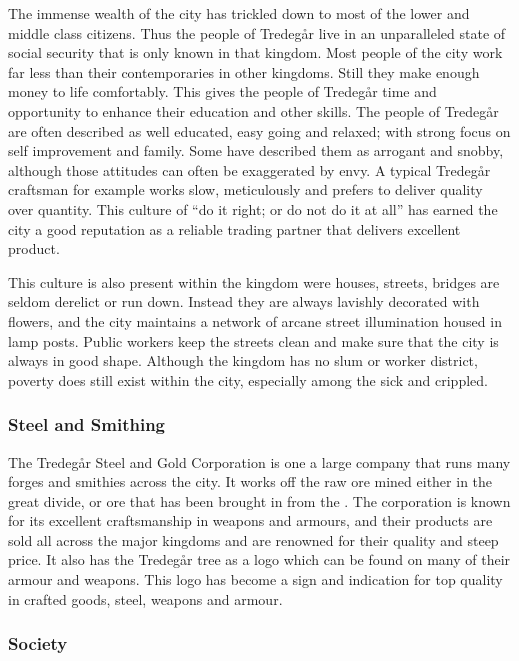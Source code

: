 The immense wealth of the city has trickled down to most of the lower and middle
class citizens. Thus the people of Tredegår live in an unparalleled state of
social security that is only known in that kingdom. Most people of the city
work far less than their contemporaries in other kingdoms. Still they make
enough money to life comfortably. This gives the people of Tredegår time and
opportunity to enhance their education and other skills. The people of Tredegår
are often described as well educated, easy going and relaxed; with strong focus
on self improvement and family. Some have described them as arrogant and snobby,
although those attitudes can often be exaggerated by envy. A typical Tredegår
craftsman for example works slow, meticulously and prefers to deliver quality
over quantity. This culture of ``do it right; or do not do it at all'' has
earned the city a good reputation as a reliable trading partner that delivers
excellent product.

This culture is also present within the kingdom were houses, streets, bridges
are seldom derelict or run down. Instead they are always lavishly decorated with
flowers, and the city maintains a network of arcane street illumination housed
in lamp posts. Public workers keep the streets clean and make sure that the
city is always in good shape. Although the kingdom has no slum or worker
district, poverty does still exist within the city, especially among the sick
and crippled.

\subsubsection{Steel and Smithing}

The Tredegår Steel and Gold Corporation is one a large company that
runs many forges and smithies across the city. It works off the raw ore mined
either in the great divide, or ore that has been brought in from the
. The corporation is known for its excellent
craftsmanship in weapons and armours, and their products are sold all across
the major kingdoms and are renowned for their quality and steep price. It also
has the Tredegår tree as a logo which can be found on many of their armour
and weapons. This logo has become a sign and indication for top quality in
crafted goods, steel, weapons and armour.

\subsubsection{Society}

